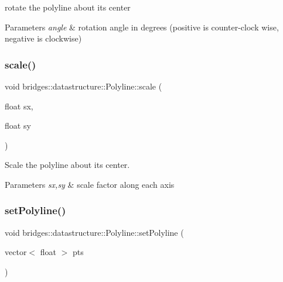 rotate the polyline about its center 


\begin{DoxyParams}{Parameters}
{\em angle} & rotation angle in degrees (positive is counter-\/clock wise, negative is clockwise) \\
\hline
\end{DoxyParams}
\mbox{\label{classbridges_1_1datastructure_1_1_polyline_adf06f484d9a48960de84ed3646903f3a}} 
\subsubsection{\texorpdfstring{scale()}{scale()}}
{\footnotesize\ttfamily void bridges\+::datastructure\+::\+Polyline\+::scale (\begin{DoxyParamCaption}\item[{float}]{sx,  }\item[{float}]{sy }\end{DoxyParamCaption})\hspace{0.3cm}{\ttfamily [inline]}}



Scale the polyline about its center. 


\begin{DoxyParams}{Parameters}
{\em sx,sy} & scale factor along each axis \\
\hline
\end{DoxyParams}
\mbox{\label{classbridges_1_1datastructure_1_1_polyline_ab1fb850dabd3ed58fd4f916992a0b9a6}} 
\subsubsection{\texorpdfstring{set\+Polyline()}{setPolyline()}}
{\footnotesize\ttfamily void bridges\+::datastructure\+::\+Polyline\+::set\+Polyline (\begin{DoxyParamCaption}\item[{vector$<$ float $>$}]{pts }\end{DoxyParamCaption})\hspace{0.3cm}{\ttfamily [inline]}}



